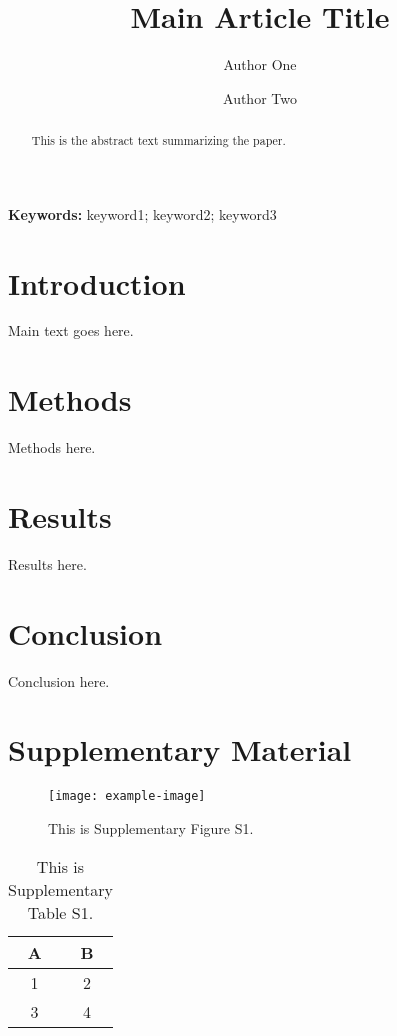 \documentclass[11pt,a4paper]{article}
\title{Main Article Title}
\author[1]{Author One}
\author[2]{Author Two}
\affil[1]{Affiliation One}
\affil[2]{Affiliation Two}
\date{}
\newcommand{\keywords}[1]{%
  \vspace{1em}
  \noindent\textbf{Keywords:} #1
}
\begin{document}
\maketitle

\begin{abstract}
This is the abstract text summarizing the paper.
\end{abstract}

\keywords{keyword1; keyword2; keyword3}

\section{Introduction}
Main text goes here.

\section{Methods}
Methods here.

\section{Results}
Results here.

\section{Conclusion}
Conclusion here.
\cite{neumannNearoptimalFeasibleSpace2021}


\clearpage
\section*{Supplementary Material}

\renewcommand{\thefigure}{S\arabic{figure}}

\renewcommand{\thetable}{S\arabic{table}}

\setcounter{figure}{0}  %
\setcounter{table}{0}   %

\begin{figure}[htbp]
    \centering
    \texttt{[image: example-image]}  %
    \caption{This is Supplementary Figure S1.}
    \label{fig:sup1}
\end{figure}

\begin{table}[htbp]
    \centering
    \begin{tabular}{cc}
    \hline
    A & B \\
    \hline
    1 & 2 \\
    3 & 4 \\
    \hline
    \end{tabular}
    \caption{This is Supplementary Table S1.}
    \label{tab:sup1}
\end{table}


\clearpage


\end{document}
